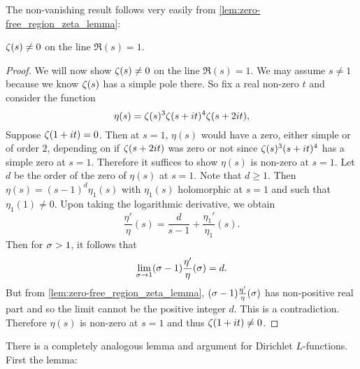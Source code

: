       The non-vanishing result follows very easily from \cref{lem:zero-free_region_zeta_lemma}:

      \begin{theorem}\label{thm:non-vanishing_of_zeta_on_Re(s)=1}
        $\zeta(s) \neq 0$ on the line $\Re(s) = 1$.
      \end{theorem}
      \begin{proof}
        We will now show $\zeta(s) \neq 0$ on the line $\Re(s) = 1$. We may assume $s \neq 1$ because we know $\zeta(s)$ has a simple pole there. So fix a real non-zero $t$ and consider the function
        \[
          \eta(s) = \zeta(s)^{3}\zeta(s+it)^{4}\zeta(s+2it),
        \]
        Suppose $\zeta(1+it) = 0$. Then at $s = 1$, $\eta(s)$ would have a zero, either simple or of order $2$, depending on if $\zeta(s+2it)$ was zero or not since $\zeta(s)^{3}(s+it)^{4}$ has a simple zero at $s = 1$. Therefore it suffices to show $\eta(s)$ is non-zero at $s = 1$. Let $d$ be the order of the zero of $\eta(s)$ at $s = 1$. Note that $d \ge 1$. Then $\eta(s) = (s-1)^{d}\eta_{1}(s)$ with $\eta_{1}(s)$ holomorphic at $s = 1$ and such that $\eta_{1}(1) \neq 0$. Upon taking the logarithmic derivative, we obtain
        \[
          \frac{\eta'}{\eta}(s) = \frac{d}{s-1}+\frac{\eta_{1}'}{\eta_{1}}(s).
        \]
        Then for $\sigma > 1$, it follows that
        \[
          \lim_{\sigma \to 1}(\sigma-1)\frac{\eta'}{\eta}(\sigma) = d.
        \]
        But from \cref{lem:zero-free_region_zeta_lemma}, $(\sigma-1)\frac{\eta'}{\eta}(\sigma)$ has non-positive real part and so the limit cannot be the positive integer $d$. This is a contradiction. Therefore $\eta(s)$ is non-zero at $s = 1$ and thus $\zeta(1+it) \neq 0$.
      \end{proof}

      There is a completely analogous lemma and argument for Dirichlet $L$-functions. First the lemma:

